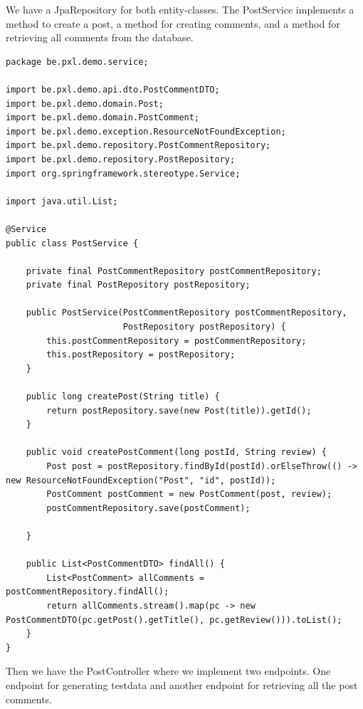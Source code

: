 We have a JpaRepository for both entity-classes.
The PostService implements a method to create a post, a method for creating comments, and a method for retrieving all comments from the database.

\begin{lstlisting}
package be.pxl.demo.service;

import be.pxl.demo.api.dto.PostCommentDTO;
import be.pxl.demo.domain.Post;
import be.pxl.demo.domain.PostComment;
import be.pxl.demo.exception.ResourceNotFoundException;
import be.pxl.demo.repository.PostCommentRepository;
import be.pxl.demo.repository.PostRepository;
import org.springframework.stereotype.Service;

import java.util.List;

@Service
public class PostService {

    private final PostCommentRepository postCommentRepository;
    private final PostRepository postRepository;

    public PostService(PostCommentRepository postCommentRepository,
                       PostRepository postRepository) {
        this.postCommentRepository = postCommentRepository;
        this.postRepository = postRepository;
    }

    public long createPost(String title) {
        return postRepository.save(new Post(title)).getId();
    }

    public void createPostComment(long postId, String review) {
        Post post = postRepository.findById(postId).orElseThrow(() -> new ResourceNotFoundException("Post", "id", postId));
        PostComment postComment = new PostComment(post, review);
        postCommentRepository.save(postComment);

    }

    public List<PostCommentDTO> findAll() {
        List<PostComment> allComments = postCommentRepository.findAll();
        return allComments.stream().map(pc -> new PostCommentDTO(pc.getPost().getTitle(), pc.getReview())).toList();
    }
}
\end{lstlisting}

Then we have the PostController where we implement two endpoints. One endpoint for generating testdata and another endpoint for retrieving all the post comments.


